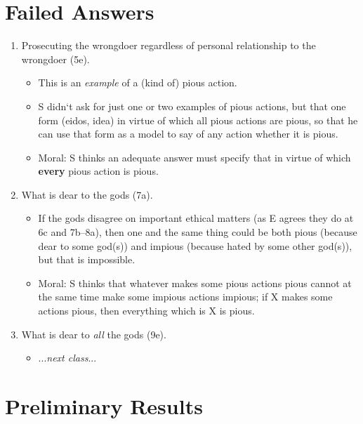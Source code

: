 \documentclass[oneside]{article}
\begin{document}
\section*{Failed Answers}
\begin{enumerate}
\item Prosecuting the wrongdoer regardless of personal relationship to the wrongdoer (5e).

\begin{itemize}\item{This is an \emph{example} of a (kind of) pious action.}
\item S didn`t ask for just one or two examples of pious  actions, but that one form (eidos, idea) in virtue of which all pious actions are pious, so that he can use that form as a model to say of any action whether it is pious.

\item{Moral: S thinks an adequate answer must specify that in virtue of which \textbf{every} pious action is pious.}\end{itemize}

\item{What is dear to the gods (7a).}

\begin{itemize}\item{If the gods disagree on important ethical matters (as E agrees they do at 6c and 7b--8a), then one and the same thing could be both pious (because dear to some god(s)) and impious (because hated by some other god(s)), but that is impossible.}
\item{Moral: S thinks that whatever makes some pious actions pious cannot at the same time make some impious actions impious; if X makes some actions pious, then everything which is X is pious.}\end{itemize}

\item{What is dear to \emph{all} the gods (9e).}
\begin{itemize}
\item{...\emph{next class}...}
\end{itemize}
\end{enumerate}


\section*{Preliminary Results}
\end{document}
